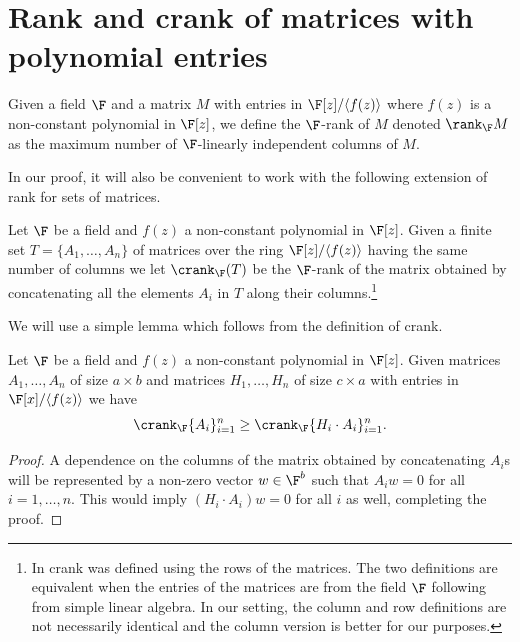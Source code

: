 \section{Rank and crank of matrices with polynomial entries}\label{sec:PreDD}

\begin{define}
Given a field $\F$ and a matrix $M$ with entries in $\F[z]/\langle f(z)\rangle$ where $f(z)$ is a non-constant polynomial in $\F[z]$, we define the $\F$-rank of $M$ denoted {\em $\rank_\F M$}  as the maximum number of $\F$-linearly independent columns of $M$.
\end{define}


In our proof, it will also be convenient to work with the following extension of rank for sets of matrices.

\begin{define}
Let $\F$ be a field and $f(z)$ a non-constant polynomial in $\F[z]$. Given a finite set $T=\{A_1,\hdots,A_n\}$ of matrices over the ring $\F[z]/\langle f(z)\rangle$ having the same number of columns we let {\em $\crank_\F(T)$} be the $\F$-rank of the matrix obtained by concatenating all the elements $A_i$ in $T$ along their columns.\footnote{
In \cite{dhar2021proof} crank was defined using the rows of the matrices. The two definitions are equivalent when the entries of the matrices are from the field $\F$ following from simple linear algebra. In our setting, the column and row definitions are not necessarily identical and the column version is better for our purposes.} 
\end{define}


We will use a simple lemma which follows from the definition of crank.

\begin{lem}\label{lem:crankMatMult}
Let $\F$ be a field and $f(z)$ a non-constant polynomial in $\F[z]$. Given matrices $A_1,\hdots,A_n$ of size $a\times b$ and matrices $H_1,\hdots, H_n$ of size $c\times a$ with entries in $\F[x]/\langle f(z)\rangle$ we have
\em{$$\crank_\F\{A_i\}_{i=1}^n\ge\crank_\F\{H_i \cdot A_i\}_{i=1}^n.$$}
\end{lem}
\begin{proof}
A dependence on the columns of the matrix obtained by concatenating $A_i$s will be represented by a non-zero vector $w\in \F^b$ such that $A_iw=0$ for all $i=1,\hdots,n$. This would imply $(H_i\cdot A_i)w=0$ for all $i$ as well, completing the proof.
\end{proof}

